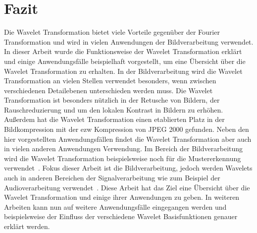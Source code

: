 \documentclass[12pt, a4paper, ngerman]{article}
\begin{document}
\section{Fazit}

Die Wavelet Transformation bietet viele Vorteile gegenüber der Fourier Transformation
und wird in vielen Anwendungen der Bildverarbeitung verwendet.
In dieser Arbeit wurde die Funktionsweise der Wavelet Transformation erklärt 
und einige Anwendungsfälle beispielhaft vorgestellt, 
um eine Übersicht über die Wavelet Transformation zu erhalten.
In der Bildverarbeitung wird die Wavelet Transformation
an vielen Stellen verwendet besonders, 
wenn zwischen verschiedenen Detailebenen unterschieden werden muss.
Die Wavelet Transformation ist besonders nützlich in der Retusche von Bildern,
der Rauschreduzierung und um den lokalen Kontrast in Bildern zu erhöhen.
Außerdem hat die Wavelet Transformation einen etablierten Platz in der Bildkompression
mit der \ac{ezw} Kompression von JPEG 2000 gefunden.
Neben den hier vorgestellten Anwendungsfällen
findet die Wavelet Transformation aber auch in vielen anderen Anwendungen Verwendung.
Im Bereich der Bildverarbeitung wird die Wavelet Transformation 
beispielsweise noch für die Mustererkennung verwendet~\cite{wavelet_patterns}.
Fokus dieser Arbeit ist die Bildverarbeitung,
jedoch werden Wavelets auch in anderen Bereichen der Signalverarbeitung 
wie zum Beispiel der Audioverarbeitung verwendet~\cite{wavelets_audio}.
Diese Arbeit hat das Ziel eine Übersicht über die Wavelet Transformation 
und einige ihrer Anwendungen zu geben.
In weiteren Arbeiten kann nun auf weitere Anwendungsfälle eingegangen werden
und beispielsweise der Einfluss der verschiedene Wavelet Basisfunktionen genauer erklärt werden.

\newpage
\printbibliography
\end{document}
